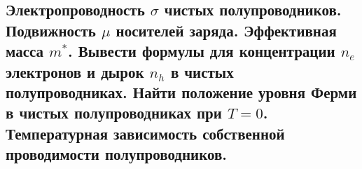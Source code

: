\subsection{Электропроводность $\sigma$ чистых полупроводников. Подвижность $\mu$ носителей заряда.
Эффективная масса $m^*$. Вывести формулы для концентрации $n_e$ электронов и дырок $n_h$
в чистых полупроводниках. Найти положение уровня Ферми в чистых полупроводниках при $T=0$.
Температурная зависимость собственной проводимости полупроводников.}

